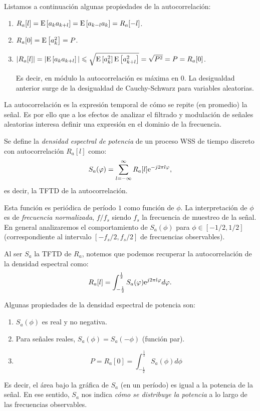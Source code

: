 Listamos a continuación algunas propiedades de la autocorrelación:
\begin{enumerate}
    \item $R_a[l] = \mathrm{E}\left[a_k a_{k+l}\right] = \mathrm{E}\left[a_{k-l} a_k\right] = R_a[-l]$.
    \item $R_a[0] = \mathrm{E}\left[a_k^2\right] = P$.
    \item $|R_a[l]| = |\mathrm{E}\left[a_k a_{k+l}\right]| \leqslant \sqrt{\mathrm{E}\left[a_k^2\right]\mathrm{E}\left[a_{k+l}^2\right]} =\sqrt{P^2} = P = R_a[0]$. 
    
    Es decir, en módulo la autocorrelación es máxima en $0$. La desigualdad anterior surge de la desigualdad de Cauchy-Schwarz para variables aleatorias.
\end{enumerate}

La autocorrelación es la expresión temporal de cómo se repite (en promedio) la señal. Es por ello que a los efectos de analizar el filtrado y modulación de señales aleatorias interesa definir una expresión en el dominio de la frecuencia.

\begin{definicion}
    Se define la \emph{densidad espectral de potencia} de un proceso WSS de tiempo discreto con autocorrelación $R_a[l]$ como:
    \begin{equation}\label{def:dep_discreta}
        S_a(\varphi) = \sum_{l=-\infty}^\infty R_a[l] \mathrm{e}^{-j2\pi l \varphi},
    \end{equation}
    es decir, la TFTD de la autocorrelación.
\end{definicion}

Esta función es periódica de período $1$ como función de $\phi$. La interpretación de $\phi$ es de \emph{frecuencia normalizada}, $f/f_s$ siendo $f_s$ la frecuencia de muestreo de la señal. En general analizaremos el comportamiento de $S_a(\phi)$ para $\phi\in[-1/2,1/2]$ (correspondiente al intervalo $[-f_s/2,f_s/2]$ de frecuencias observables).

Al ser $S_a$ la TFTD de $R_a$, notemos que podemos recuperar la autocorrelación de la densidad espectral como:
\begin{equation*}
    R_a[l] = \int_{-\frac12}^{\frac12} S_a(\varphi) \mathrm{e}^{j2\pi l \varphi} d\varphi.
\end{equation*}

Algunas propiedades de la densidad espectral de potencia son:
\begin{enumerate}
    \item $S_a(\phi)$ es real y no negativa.
    \item Para señales reales, $S_a(\phi)=S_a(-\phi)$ (función par).
    \item \begin{equation*}
    P = R_a[0] = \int_{-\frac12}^{\frac12} S_a(\phi) d\phi
    \end{equation*}
\end{enumerate}
Es decir, el área bajo la gráfica de $S_a$ (en un período) es igual a la potencia de la señal. En ese sentido, $S_a$ nos indica \emph{cómo se distribuye la potencia} a lo largo de las frecuencias observables.

